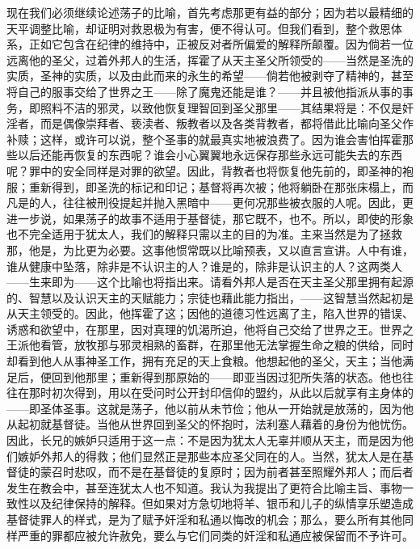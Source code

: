 现在我们必须继续论述荡子的比喻，首先考虑那更有益的部分；因为若以最精细的天平调整比喻，却证明对救恩极为有害，便不得认可。但我们看到，整个救恩体系，正如它包含在纪律的维持中，正被反对者所偏爱的解释所颠覆。因为倘若一位远离他的圣父，过着外邦人的生活，挥霍了从天主圣父所领受的——当然是圣洗的实质，圣神的实质，以及由此而来的永生的希望——倘若他被剥夺了精神的，甚至将自己的服事交给了世界之王——除了魔鬼还能是谁？——并且被他指派从事的事务，即照料不洁的邪灵，以致他恢复理智回到圣父那里——其结果将是：不仅是奸淫者，而是偶像崇拜者、亵渎者、叛教者以及各类背教者，都将借此比喻向圣父作补赎；这样，或许可以说，整个圣事的就最真实地被浪费了。因为谁会害怕挥霍那些以后还能再恢复的东西呢？谁会小心翼翼地永远保存那些永远可能失去的东西呢？罪中的安全同样是对罪的欲望。因此，背教者也将恢复他先前的，即圣神的袍服；重新得到，即圣洗的标记和印记；基督将再次被；他将躺卧在那张床榻上，而凡是的人，往往被刑役提起并抛入黑暗中——更何况那些被衣服的人呢。因此，更进一步说，如果荡子的故事不适用于基督徒，那它既不，也不。所以，即使的形象也不完全适用于犹太人，我们的解释只需以主的目的为准。主来当然是为了拯救那，他是，为比更为必要。这事他惯常既以比喻预表，又以直言宣讲。人中有谁，谁从健康中坠落，除非是不认识主的人？谁是的，除非是认识主的人？这两类人——生来即为——这个比喻也将指出来。请看外邦人是否在天主圣父那里拥有起源的、智慧以及认识天主的天赋能力；宗徒也藉此能力指出，——这智慧当然起初是从天主领受的。因此，他挥霍了这；因他的道德习性远离了主，陷入世界的错误、诱惑和欲望中，在那里，因对真理的饥渴所迫，他将自己交给了世界之王。世界之王派他看管，放牧那与邪灵相熟的畜群，在那里他无法掌握生命之粮的供给，同时却看到他人从事神圣工作，拥有充足的天上食粮。他想起他的圣父，天主；当他满足后，便回到他那里；重新得到那原始的——即亚当因过犯所失落的状态。他也往往在那时初次得到，用以在受问时公开封印信仰的盟约，从此以后就享有主身体的——即圣体圣事。这就是荡子，他以前从未节俭；他从一开始就是放荡的，因为他从起初就基督徒。当他从世界回到圣父的怀抱时，法利塞人藉着的身份为他忧伤。因此，长兄的嫉妒只适用于这一点：不是因为犹太人无辜并顺从天主，而是因为他们嫉妒外邦人的得救；他们显然正是那些本应圣父同在的人。当然，犹太人是在基督徒的蒙召时悲叹，而不是在基督徒的复原时；因为前者甚至照耀外邦人；而后者发生在教会中，甚至连犹太人也不知道。我认为我提出了更符合比喻主旨、事物一致性以及纪律保持的解释。但如果对方急切地将羊、银币和儿子的纵情享乐塑造成基督徒罪人的样式，是为了赋予奸淫和私通以悔改的机会；那么，要么所有其他同样严重的罪都应被允许赦免，要么与它们同类的奸淫和私通应被保留而不予许可。\par

